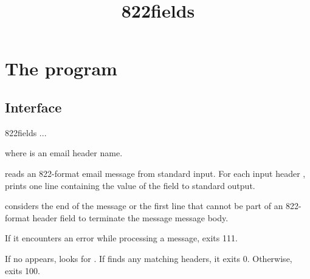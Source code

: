 \documentclass{book}
\title{822fields}
\begin{document}
\section{The  program}

\subsection{Interface}
\begin{code}%
  822fields  ...
\end{code}
where  is an email header name.

 reads an 822-format email message from standard input.
For each input header ,  prints
one line containing the value of the field to standard output.

 considers the end of the message or the first line that
cannot be part of an 822-format header field to terminate the message
message body.

If it encounters an error while processing a message,
 exits 111.

If no  appears,  looks for .
If  finds any matching headers, it exits 0.
Otherwise,  exits 100.
\end{document}
